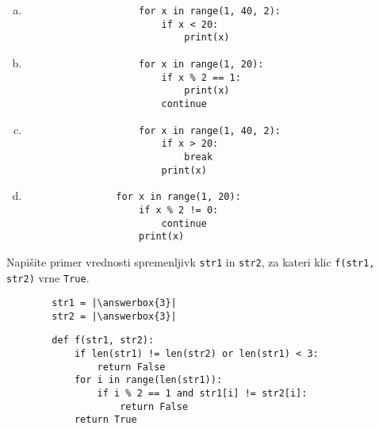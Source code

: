 \documentclass[arhiv, 10pt]{../izpit}
\newcommand{\inlinepy}[1]{\texttt{#1}}
\newcommand{\answerbox}[1]{\framebox{\vphantom{\large M}\hspace{#1cm}}}
\begin{document}
        \begin{multicols}{2}
        \begin{enumerate}[(a)]
\item 
                \begin{verbatim}
                    for x in range(1, 40, 2):
                        if x < 20:
                            print(x)
                \end{verbatim}
            
\item 
                \begin{verbatim}
                    for x in range(1, 20):
                        if x % 2 == 1:
                            print(x)
                        continue
                \end{verbatim}
            
\item 
                \begin{verbatim}
                    for x in range(1, 40, 2):
                        if x > 20:
                            break
                        print(x)
                \end{verbatim}
            
\item 
            \begin{verbatim}
                for x in range(1, 20):
                    if x % 2 != 0:
                        continue
                    print(x)
            \end{verbatim}
        
\end{enumerate}

        \end{multicols}
    
        \naloga*
        \begin{multicols}{2}
        \noindent
        Napišite primer vrednosti spremenljivk \inlinepy{str1} in \inlinepy{str2}, za kateri klic \inlinepy{f(str1, str2)} vrne \inlinepy{True}.
        \begin{verbatim}
        str1 = |\answerbox{3}|
        str2 = |\answerbox{3}|
        \end{verbatim}
        \vfil
        \columnbreak
        \begin{verbatim}
        def f(str1, str2):
            if len(str1) != len(str2) or len(str1) < 3:
                return False
            for i in range(len(str1)):
                if i % 2 == 1 and str1[i] != str2[i]:
                    return False
            return True
        \end{verbatim}
        \end{multicols}
    
\end{document}

